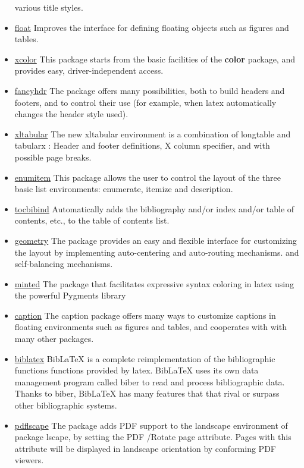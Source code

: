 \begin{itemize}
          various title styles.
    \item \href{https://www.ctan.org/pkg/float}{float} Improves the interface for defining floating objects
          such as figures and tables.
    \item \href{https://www.ctan.org/pkg/xcolor}{xcolor} This package starts from the basic facilities
          of the \textbf{color} package, and provides easy, driver-independent access.
    \item \href{https://www.ctan.org/pkg/fancyhdr}{fancyhdr} The package offers many possibilities,
          both to build headers and footers, and to control their use (for example, when \gls{latex} automatically changes the header style used).
    \item \href{https://www.ctan.org/pkg/xltabular}{xltabular} The new xltabular environment is a combination
          of longtable and tabularx : Header and footer definitions, X column specifier,
          and with possible page breaks.
    \item \href{https://www.ctan.org/pkg/enumitem}{enumitem} This package allows the user to control
          the layout of the three basic list environments: enumerate, itemize and description.
    \item \href{https://www.ctan.org/pkg/tocbibind}{tocbibind} Automatically adds the bibliography and/or
          index and/or table of contents, etc., to the table of contents list.
    \item \href{https://www.ctan.org/pkg/geometry}{geometry} The package provides an easy and flexible
          interface for customizing the layout by implementing auto-centering and auto-routing mechanisms.
          and self-balancing mechanisms.
    \item \href{https://www.ctan.org/pkg/minted}{minted} The package that facilitates expressive syntax coloring in
          \gls{latex} using the powerful Pygments library
    \item \href{https://www.ctan.org/pkg/caption}{caption} The caption package offers many ways to customize captions
          in floating environments such as figures and tables, and cooperates with with many other packages.
    \item \href{https://www.ctan.org/pkg/biblatex}{biblatex} BibLaTeX is a complete reimplementation of the bibliographic functions
          functions provided by \gls{latex}. BibLaTeX uses its own data management program called biber
          to read and process bibliographic data. Thanks to biber, BibLaTeX has many features that
          that rival or surpass other bibliographic systems.
    \item \href{https://ctan.org/pkg/pdflscape}{pdflscape} The package adds PDF support to the landscape
          environment of package lscape, by setting the PDF /Rotate page attribute. Pages with this attribute will be displayed
          in landscape orientation by conforming PDF viewers.
\end{itemize}

